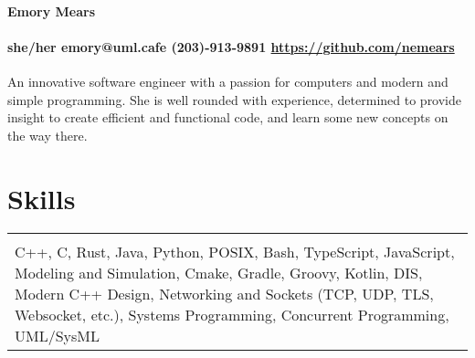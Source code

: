 \documentclass[11pt]{article}
\begin{document}
\paragraph{\centering \huge Emory Mears \\ }
\paragraph{\centering she/her emory@uml.cafe (203)-913-9891 \url{https://github.com/nemears}\\}

An innovative software engineer with a passion for computers and modern and simple programming. She is well rounded with experience,
 determined to provide insight to create efficient and functional code, and learn some new concepts on the way there. 

\section*{Skills}
\begin{tabular}{p{18.5cm}}
  \hline
  \multicolumn{1}{c}{} \\
  C++, C, Rust, Java, Python, POSIX, Bash, TypeScript, JavaScript, Modeling and Simulation, Cmake, Gradle, Groovy, Kotlin, 
  DIS, Modern C++ Design, Networking and Sockets (TCP, UDP, TLS, Websocket, etc.), Systems Programming, Concurrent Programming, UML/SysML
\end{tabular}

\end{document}

